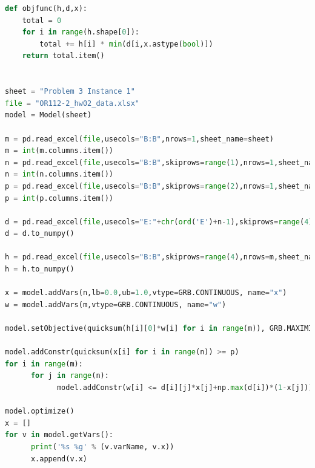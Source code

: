 \documentclass[12pt]{article}
\begin{document}
\begin{enumerate}
\begin{enumerate}
\begin{lstlisting}[language=Python]
def objfunc(h,d,x):
    total = 0
    for i in range(h.shape[0]):
        total += h[i] * min(d[i,x.astype(bool)])
    return total.item()


sheet = "Problem 3 Instance 1"
file = "OR112-2_hw02_data.xlsx"
model = Model(sheet)

m = pd.read_excel(file,usecols="B:B",nrows=1,sheet_name=sheet)
m = int(m.columns.item())
n = pd.read_excel(file,usecols="B:B",skiprows=range(1),nrows=1,sheet_name=sheet)
n = int(n.columns.item())
p = pd.read_excel(file,usecols="B:B",skiprows=range(2),nrows=1,sheet_name=sheet)
p = int(p.columns.item())

d = pd.read_excel(file,usecols="E:"+chr(ord('E')+n-1),skiprows=range(4),nrows=m,sheet_name=sheet)
d = d.to_numpy()

h = pd.read_excel(file,usecols="B:B",skiprows=range(4),nrows=m,sheet_name=sheet)
h = h.to_numpy()

x = model.addVars(n,lb=0.0,ub=1.0,vtype=GRB.CONTINUOUS, name="x")
w = model.addVars(m,vtype=GRB.CONTINUOUS, name="w")

model.setObjective(quicksum(h[i][0]*w[i] for i in range(m)), GRB.MAXIMIZE)

model.addConstr(quicksum(x[i] for i in range(n)) >= p)
for i in range(m):
      for j in range(n):
            model.addConstr(w[i] <= d[i][j]*x[j]+np.max(d[i])*(1-x[j]))

model.optimize()
x = []
for v in model.getVars():
      print('%s %g' % (v.varName, v.x))
      x.append(v.x)


\end{lstlisting}
\end{enumerate}
\end{enumerate}
\end{document}
